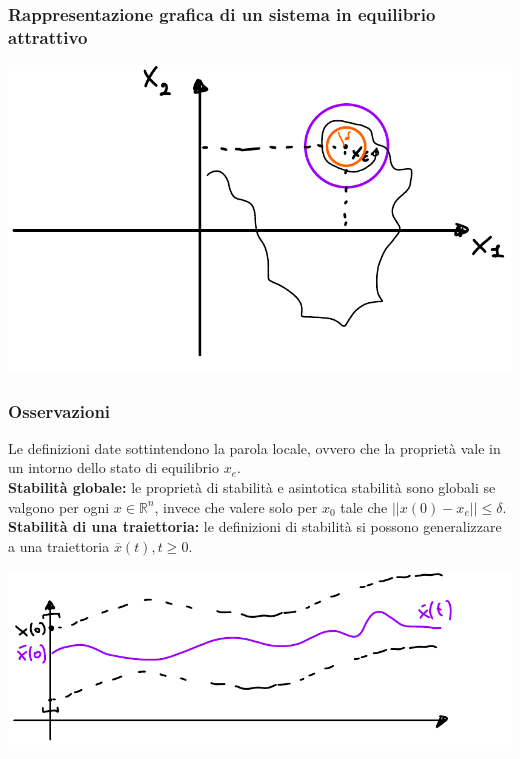 \documentclass{article}
\numberwithin{equation}{subsection}
\begin{document}
\subsubsection*{Rappresentazione grafica di un sistema in equilibrio attrattivo}
\begin{center}
    \includegraphics[scale=0.3]{Images/Equilibrio_attrattivo.png}
\end{center}

\subsubsection{Osservazioni}
Le definizioni date sottintendono la parola locale, ovvero che la proprietà vale in un intorno dello stato di equilibrio $x_e$.
\vspace*{0.2cm}\\
\textbf{Stabilità globale:} le proprietà di stabilità e asintotica stabilità sono globali se valgono per ogni $x \in \mathbb{R}^n$, invece che valere solo per $x_0$ tale che $|| x(0)-x_e || \leq \delta $.
\vspace*{0.2cm}\\
\textbf{Stabilità di una traiettoria:} le definizioni di stabilità si possono generalizzare a una traiettoria $\overline{x}(t), t \geq 0$.
\begin{center}
    \includegraphics[scale=0.3]{Images/Stabilita_traiettoria.png}
\end{center}
\end{document}
